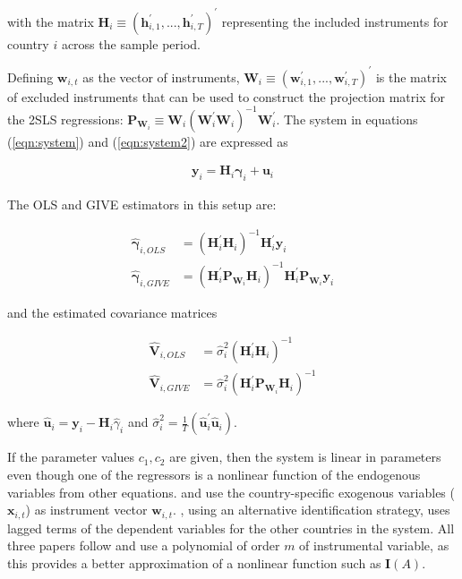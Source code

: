 \documentclass[../base.tex]{subfiles}
\begin{document}
with the matrix $\mathbf{H}_i \equiv (\mathbf{h}_{i,1}^{\prime},..., \mathbf{h}_{i,T}^{\prime})^{\prime}$ representing the included instruments for country $i$ across the sample period. 

Defining $\mathbf{w}_{i,t}$ as the vector of instruments, $\mathbf{W}_i \equiv (\mathbf{w}_{i,1}^{\prime},..., \mathbf{w}_{i,T}^{\prime})^{\prime}$ is the matrix of excluded instruments that can be used to construct the projection matrix for the 2SLS regressions: $\mathbf{P}_{\mathbf{W}_i} \equiv \mathbf{W}_i (\mathbf{W}_i^{\prime} \mathbf{W}_i)^{-1} \mathbf{W}_i^{\prime}$. The system in equations (\ref{eqn:system}) and (\ref{eqn:system2}) are expressed as

\begin{align}
	\mathbf{y}_i = \mathbf{H}_i \mathbf{\gamma}_i + \mathbf{u}_i \label{eqn:matrix_system}
\end{align}

The OLS and GIVE estimators in this setup are:

\begin{align}
	\hat{\mathbf{\gamma}}_{i, OLS} &= (\mathbf{H}_i^{\prime} \mathbf{H}_i)^{-1} \mathbf{H}_i^{\prime} \mathbf{y}_i	\label{eqn:ols}\\	
	\hat{\mathbf{\gamma}}_{i, GIVE} &= (\mathbf{H}_i^{\prime} \mathbf{P}_{\mathbf{W}_i} \mathbf{H}_i)^{-1} \mathbf{H}_i^{\prime} \mathbf{P}_{\mathbf{W}_i} \mathbf{y}_i \label{eqn:give}	
\end{align}

and the estimated covariance matrices

\begin{align*}
	\hat{\mathbf{V}}_{i, OLS} &= \hat{\sigma}^2_i (\mathbf{H}_i^{\prime} \mathbf{H}_i)^{-1} \\
	\hat{\mathbf{V}}_{i, GIVE} &= \hat{\sigma}^2_i (\mathbf{H}_i^{\prime} \mathbf{P}_{\mathbf{W}_i} \mathbf{H}_i)^{-1}
\end{align*}


where $\hat{\mathbf{u}}_i = \mathbf{y}_i - \mathbf{H}_i \hat{\gamma}_i$ and $\hat{\sigma}^2_i = \frac{1}{T} (\hat{\mathbf{u}}_i^{\prime} \hat{\mathbf{u}}_i)$. 

If the parameter values $c_1, c_2$ are given, then the system is linear in parameters even though one of the regressors is a nonlinear function of the endogenous variables from other equations. \cite{pesaran2007econometrics} and \cite{massacci2007identification} use the country-specific exogenous variables ($\mathbf{x}_{i,t}$) as instrument vector $\mathbf{w}_{i,t}$. \cite{metiu2012sovereign}, using an alternative identification strategy, uses lagged terms of the dependent variables for the other countries in the system. All three papers follow \cite{kelejian1971two} and use a polynomial of order $m$ of instrumental variable, as this provides a better approximation of a nonlinear function such as $\mathbf{I}(A)$.
\end{document}
